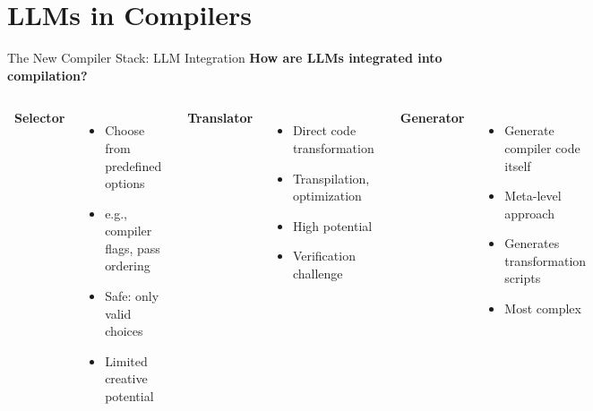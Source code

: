 \documentclass[aspectratio=169,10pt]{beamer}
\begin{document}
\section{LLMs in Compilers}

\begin{frame}{The New Compiler Stack: LLM Integration}
    \textbf{How are LLMs integrated into compilation?}
    
    \vspace{1em}
    \begin{columns}[T]
    \textbf{\faMousePointer~Selector}
    \begin{itemize}
        \item Choose from predefined options
        \item e.g., compiler flags, pass ordering
        \item Safe: only valid choices
        \item Limited creative potential
    \end{itemize}
    
    \textbf{\faExchange*~Translator}
    \begin{itemize}
        \item Direct code transformation
        \item Transpilation, optimization
        \item High potential
        \item Verification challenge
    \end{itemize}
    
    \textbf{\faCode~Generator}
    \begin{itemize}
        \item Generate compiler code itself
        \item Meta-level approach
        \item Generates transformation scripts
        \item Most complex
    \end{itemize}
    \end{columns}
\end{frame}
\end{document}

